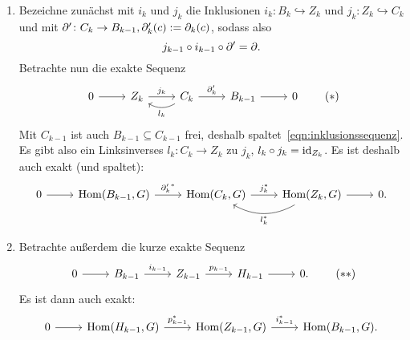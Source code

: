 \begin{vorbereitung}
  \begin{enumerate}
    \item 
      Bezeichne zunächst mit $i_k$ und $j_k$ die Inklusionen $i_k \colon B_k \hookrightarrow Z_k$ und $j_k \colon Z_k \hookrightarrow C_k$ und mit $\partial'\colon C_k \to B_{k-1}, \partial'_k(c) := \partial_k(c)$, sodass also
      \begin{equation*}
        j_{k-1} \circ i_{k-1} \circ \partial' = \partial.
      \end{equation*}
      Betrachte nun die exakte Sequenz
      \begin{equation*}
        \begin{tikzcd}
          0 \arrow{r}{} & Z_k \arrow{r}{j_k}  & C_k \arrow[bend left]{l}{l_k}
                                                    \arrow{r}{\del'_k}        & B_{k-1} \arrow{r}{} & 0
        \end{tikzcd}
        \tag{$*$}\label{eqn:inklusionssequenz}
      \end{equation*}
      Mit $C_{k-1}$ ist auch $B_{k-1} \subseteq C_{k-1}$ frei, deshalb spaltet~\eqref{eqn:inklusionssequenz}.
      Es gibt also ein Linksinverses $l_k\colon C_k \to Z_k$ zu $j_k$, $l_k \circ j_k = \operatorname{id}_{Z_k}$.
      Es ist deshalb auch exakt (und spaltet):
      \begin{equation*}
        \begin{tikzcd}
          0 \arrow{r}{} & \Hom(B_{k-1},G) \arrow{r}{{\del'_k}^*}  & \Hom(C_k,G) \arrow{r}{j_k^*}  & \Hom(Z_k,G) \arrow[bend left]{l}{l_k^*}
                                                                                                              \arrow{r}{} & 0.
        \end{tikzcd}
      \end{equation*}
    \item
      Betrachte außerdem die kurze exakte Sequenz
      \begin{equation*}
        \begin{tikzcd}
          0 \arrow{r}{} & B_{k-1} \arrow{r}{i_{k-1}}  & Z_{k-1} \arrow{r}{p_{k-1}}  & H_{k-1} \arrow{r}{} & 0.
        \end{tikzcd}
        \tag{$**$}\label{eqn:inklusion_projektion_sequenz}
      \end{equation*}
      Es ist dann auch exakt:
      \begin{equation*}
        \begin{tikzcd}
          0 \arrow{r}{} & \Hom(H_{k-1},G) \arrow{r}{p_{k-1}^*}  & \Hom(Z_{k-1},G) \arrow{r}{i_{k-1}^*}  & \Hom(B_{k-1},G).
        \end{tikzcd}
      \end{equation*}
  \end{enumerate}
\end{vorbereitung}
